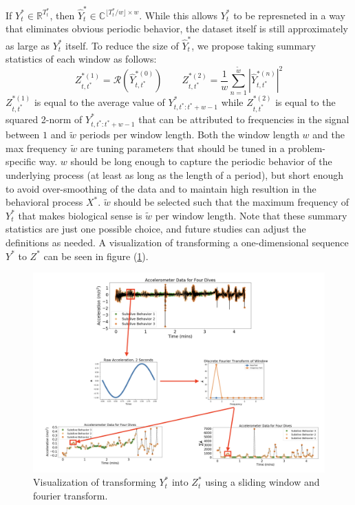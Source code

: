 If $Y^*_t \in \mathbb{R}^{T^*_t}$, then $\hat{Y}_t^* \in \mathbb{C}^{\lfloor T^*_t / w \rfloor \times w}$. While this allows $Y^*_t$ to be represneted in a way that eliminates obvious periodic behavior, the dataset itself is still approximately as large as $Y^*_t$ itself. To reduce the size of $\hat{Y}^*_t$, we propose taking summary statistics of each window as follows:
%
$$Z_{t,t^*}^{*(1)} = \mathcal{R}\left(\hat{Y}^{*(0)}_{t,t^*}\right) \qquad Z_{t,t^*}^{*(2)} = \frac{1}{w}\sum_{n=1}^{\tilde{w}}|\hat{Y}^{*(n)}_{t,t^*}|^2$$
%
$Z_{t,t^*}^{*(1)}$ is equal to the average value of $Y_{t,t^*:t^*+w-1}^*$ while $Z_{t,t^*}^{*(2)}$ is equal to the squared 2-norm of $Y_{t,t^*:t^*+w-1}^*$ that can be attributed to frequencies in the signal between $1$ and $\tilde{w}$ periods per window length. Both the window length $w$ and the max frequency $\tilde{w}$ are tuning parameters that should be tuned in a problem-specific way. $w$ should be long enough to capture the periodic behavior of the underlying process (at least as long as the length of a period), but short enough to avoid over-smoothing of the data and to maintain high resultion in the behavioral process $X^*$. $\tilde{w}$ should be selected such that the maximum frequency of $Y_t^*$ that makes biological sense is $\tilde{w}$ per window length. Note that these summary statistics are just one possible choice, and future studies can adjust the definitions as needed. A visualization of transforming a one-dimensional sequence $Y^*$ to $Z^*$ can be seen in figure (\ref{fig:fourier_example}).

\begin{figure}[h!]
	\centering
	\includegraphics[width=7.5in]{../Plots/fourier_transform.png}
	\caption{Visualization of transforming $Y^*_t$ into $Z^*_t$ using a sliding window and fourier transform.}
	\label{fig:fourier_example}
\end{figure}


